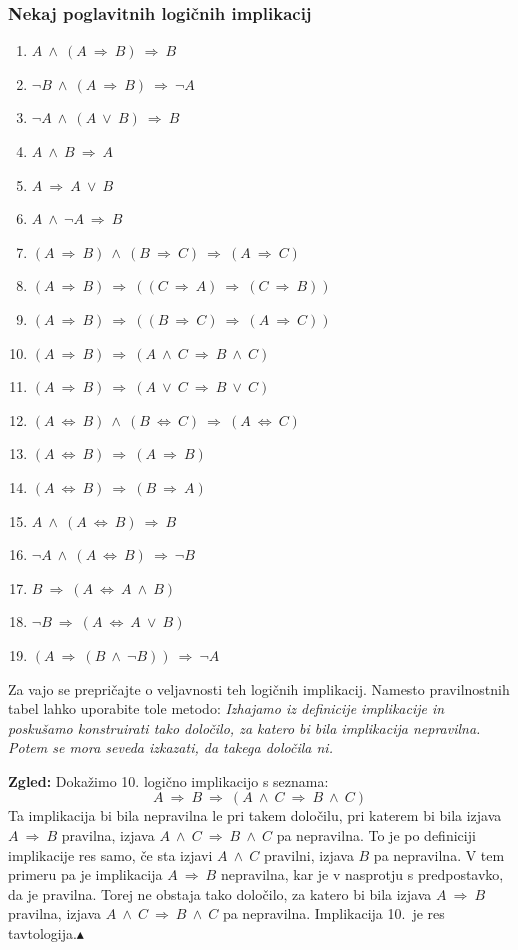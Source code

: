 \documentclass[11pt,paper=b5,footinclude,headinclude]{scrbook} %
\def\ali {{~\vee~}}
\def\inn {{~\wedge~}}
\def\sledi {{~\Rightarrow~}}
\def\cee {{~\Leftrightarrow~}}
\def\zgled{\noindent\textbf{\color{blue} Zgled: }}
\def\kz{{\hfill{\color{blue}$\blacktriangle$}}}%
\begin{document}
\subsubsection*{Nekaj poglavitnih logičnih implikacij}

\begin{enumerate}
  \item $A \inn (A \sledi B) \sledi B$
  \item $\neg B \inn (A \sledi B) \sledi \neg A$
  \item $\neg A \inn (A \ali B) \sledi B$
  \item $A \inn B \sledi A$
  \item $A \sledi A\ali B$
  \item $A \inn \neg A\sledi B$
  \item $(A \sledi B) \inn (B \sledi C) \sledi (A\sledi C)$
  \item $(A \sledi B) \sledi ((C \sledi A) \sledi (C\sledi B))$
  \item $(A \sledi B) \sledi ((B \sledi C) \sledi (A\sledi C))$
  \item $(A \sledi B) \sledi (A\inn C \sledi B\inn C)$
  \item $(A \sledi B) \sledi (A\ali C \sledi B\ali C)$
  \item $(A \cee B) \inn (B\cee C) \sledi (A\cee C)$
  \item $(A \cee B) \sledi (A\sledi B)$
  \item $(A \cee B) \sledi (B\sledi A)$
  \item $A \inn (A \cee B) \sledi B$
  \item $\neg A \inn (A \cee B) \sledi \neg B$
  \item $B\sledi (A\cee A \inn B)$
  \item $\neg B\sledi (A\cee A \ali B)$
  \item $(A\sledi (B\inn \neg B)) \sledi \neg A$
\end{enumerate}

Za vajo se prepričajte o veljavnosti teh logičnih implikacij. Namesto pravilnostnih tabel lahko uporabite tole metodo:  {\em Izhajamo iz definicije implikacije in poskušamo konstruirati tako določilo, za katero bi bila implikacija nepravilna. Potem se mora seveda izkazati, da takega določila ni.}

\bigskip
\zgled
Dokažimo 10. logično implikacijo s seznama:
$$A \sledi B \sledi (A\inn C \sledi B\inn C)$$
Ta implikacija bi bila nepravilna le pri takem določilu, pri katerem bi bila izjava
$A \sledi B$ pravilna, izjava $A\inn C \sledi B\inn C$ pa nepravilna. To je po definiciji implikacije res samo, če sta izjavi $A\inn C$ pravilni, izjava $B$ pa nepravilna.
V tem primeru pa je implikacija $A \sledi B$ nepravilna, kar je v nasprotju s predpostavko, da je
pravilna. Torej ne obstaja tako določilo, za katero bi bila izjava  $A \sledi B$ pravilna, izjava $A\inn C \sledi B\inn C$ pa nepravilna. Implikacija 10.~je res tavtologija.\kz
\end{document}
